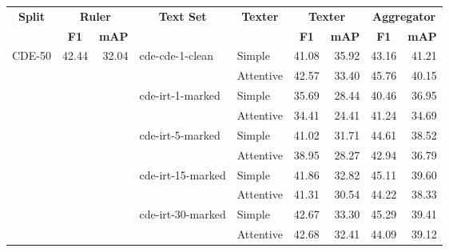 \begin{tabular}{| l | r | r | l | l | r | r || r | r |}
    \hline

    \multicolumn{1}{|c|}{\multirow{2}{*}{\textbf{Split}}} &
    \multicolumn{2}{|c|}{\multirow{1}{*}{\textbf{Ruler}}} &
    \multicolumn{1}{|c|}{\multirow{1}{*}{\textbf{Text Set}}} &
    \multicolumn{1}{|c|}{\multirow{2}{*}{\textbf{Texter}}} &
    \multicolumn{2}{|c|}{\multirow{1}{*}{\textbf{Texter}}} &
    \multicolumn{2}{|c|}{\multirow{1}{*}{\textbf{Aggregator}}} \\

    &
    \multicolumn{1}{|c|}{\textbf{F1}} &
    \multicolumn{1}{|c|}{\textbf{mAP}} &
    &
    &
    \multicolumn{1}{|c|}{\textbf{F1}} &
    \multicolumn{1}{|c|}{\textbf{mAP}} &
    \multicolumn{1}{|c|}{\textbf{F1}} &
    \multicolumn{1}{|c|}{\textbf{mAP}} \\

    \hline \hline

    \multirow{10}{*}{CDE-50} & \multirow{10}{*}{42.44} & \multirow{10}{*}{32.04} & \multirow{2}{*}{cde-cde-1-clean}   & Simple    & 41.08 & 35.92 & 43.16 & 41.21 \\
                             &                         &                         &                                    & Attentive & 42.57 & 33.40 & 45.76 & 40.15 \\ \cline{4-9}
                             &                         &                         & \multirow{2}{*}{cde-irt-1-marked}  & Simple    & 35.69 & 28.44 & 40.46 & 36.95 \\
                             &                         &                         &                                    & Attentive & 34.41 & 24.41 & 41.24 & 34.69 \\ \cline{4-9}
                             &                         &                         & \multirow{2}{*}{cde-irt-5-marked}  & Simple    & 41.02 & 31.71 & 44.61 & 38.52 \\
                             &                         &                         &                                    & Attentive & 38.95 & 28.27 & 42.94 & 36.79 \\ \cline{4-9}
                             &                         &                         & \multirow{2}{*}{cde-irt-15-marked} & Simple    & 41.86 & 32.82 & 45.11 & 39.60 \\
                             &                         &                         &                                    & Attentive & 41.31 & 30.54 & 44.22 & 38.33 \\ \cline{4-9}
                             &                         &                         & \multirow{2}{*}{cde-irt-30-marked} & Simple    & 42.67 & 33.30 & 45.29 & 39.41 \\
                             &                         &                         &                                    & Attentive & 42.68 & 32.41 & 44.09 & 39.12 \\ \hline \hline


\end{tabular}
